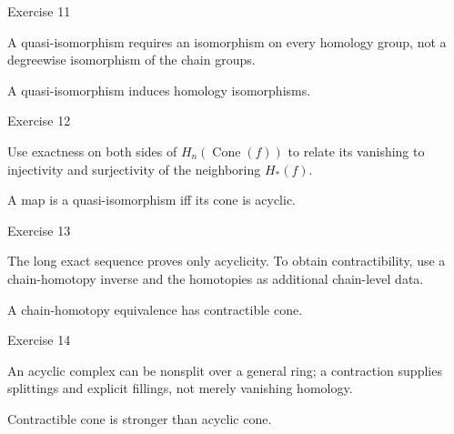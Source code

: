 \begin{exercise}\label{exr:viii24-11}
Exercise 11
\end{exercise}
\begin{hint}
A quasi-isomorphism requires an isomorphism on every homology group, not a degreewise isomorphism of the chain groups.
\end{hint}
\begin{solution}
A quasi-isomorphism induces homology isomorphisms.
\end{solution}

\begin{exercise}\label{exr:viii24-12}
Exercise 12
\end{exercise}
\begin{hint}
Use exactness on both sides of \(H_n(\operatorname{Cone}(f))\) to relate its vanishing to injectivity and surjectivity of the neighboring \(H_*(f)\).
\end{hint}
\begin{solution}
A map is a quasi-isomorphism iff its cone is acyclic.
\end{solution}

\begin{exercise}\label{exr:viii24-13}
Exercise 13
\end{exercise}
\begin{hint}
The long exact sequence proves only acyclicity. To obtain contractibility, use a chain-homotopy inverse and the homotopies as additional chain-level data.
\end{hint}
\begin{solution}
A chain-homotopy equivalence has contractible cone.
\end{solution}

\begin{exercise}\label{exr:viii24-14}
Exercise 14
\end{exercise}
\begin{hint}
An acyclic complex can be nonsplit over a general ring; a contraction supplies splittings and explicit fillings, not merely vanishing homology.
\end{hint}
\begin{solution}
Contractible cone is stronger than acyclic cone.
\end{solution}

